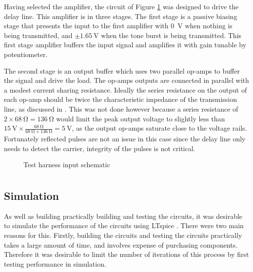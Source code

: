 Having selected the amplifier, the circuit of Figure \ref{fig:test-harness-output-sch} was designed to drive the delay line. This amplifier is in three stages. The first stage is a passive biasing stage that presents the input to the first amplifier with \SI{0}{\volt} when nothing is being transmitted, and $\pm \SI{1.65}{\volt}$ when the tone burst is being transmitted. This first stage amplifier buffers the input signal and amplifies it with gain tunable by potentiometer.

The second stage is an output buffer which uses two parallel op-amps to buffer the signal and drive the load. The op-amps outputs are connected in parallel with a modest current sharing resistance. Ideally the series resistance on the output of each op-amp should be twice the characteristic impedance of the transmission line, as discussed in \cite{intersil2005}. This was not done however because a series resistance of $2 \times \SI{68}{\ohm} = \SI{136}{\ohm}$ would limit the peak output voltage to slightly less than $\SI{15}{\volt} \times \frac{\SI{68}{\ohm}}{\SI{68}{\ohm} + \SI{136}{\ohm}} = \SI{5}{\volt}$, as the output op-amps saturate close to the voltage rails. Fortunately reflected pulses are not an issue in this case since the delay line only needs to detect the carrier, integrity of the pulses is not critical.


\begin{figure}[ht]
	\centering
	\caption{Test harness input schematic }
	\label{fig:test-harness-output-sch}
\end{figure}

\chapter{} \label{sec:verification}

\section{ Simulation}
As well as building practically building and testing the circuits, it was desirable to simulate the performance of the circuits using LTspice \cite{linear2017}. There were two main reasons for this. Firstly, building the circuits and testing the circuits practically takes a large amount of time, and involves expense of purchasing components. Therefore it was desirable to limit the number of iterations of this process by first testing performance in simulation.

